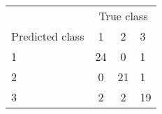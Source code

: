 \begin{tabular}{lccl}
  \hline
  & \multicolumn{3}{c}{True class}\\
 Predicted class & 1 & 2 & 3 \\
   \hline
1 &  24 &   0 &   1 \\ 
  2 &   0 &  21 &   1 \\ 
  3 &   2 &   2 &  19 \\ 
   \hline
\end{tabular}

